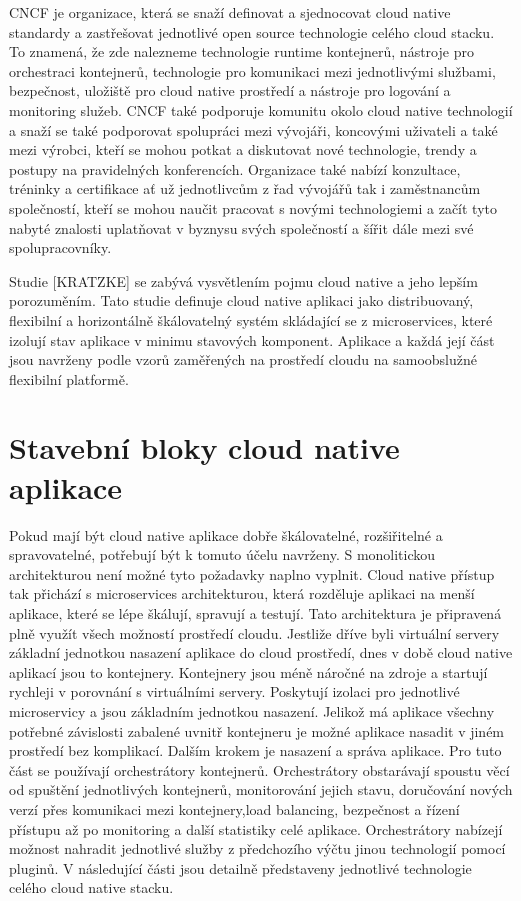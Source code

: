 	CNCF je organizace, která se snaží definovat a sjednocovat cloud native standardy a zastřešovat jednotlivé open source technologie celého cloud stacku. To znamená, že zde nalezneme technologie runtime kontejnerů, nástroje pro orchestraci kontejnerů, technologie pro komunikaci mezi jednotlivými službami, bezpečnost, uložiště pro cloud native prostředí a nástroje pro logování a monitoring služeb. CNCF také podporuje komunitu okolo cloud native technologií a snaží se také podporovat spolupráci mezi vývojáři, koncovými uživateli a také mezi výrobci, kteří se mohou potkat a diskutovat nové technologie, trendy a postupy na pravidelných konferencích. Organizace také nabízí konzultace, tréninky a certifikace ať už jednotlivcům z řad vývojářů tak i zaměstnancům společností, kteří se mohou naučit pracovat s novými technologiemi a začít tyto nabyté znalosti uplatňovat v byznysu svých společností a šířit dále mezi své spolupracovníky. \par
	    Studie [KRATZKE] se zabývá vysvětlením pojmu cloud native a jeho lepším porozuměním. Tato studie definuje cloud native aplikaci jako distribuovaný, flexibilní a horizontálně škálovatelný systém skládající se z microservices, které izolují stav aplikace v minimu stavových komponent. Aplikace a každá její část jsou navrženy podle vzorů zaměřených na prostředí cloudu na samoobslužné flexibilní platformě. \par
	        
\section{Stavební bloky cloud native aplikace}
		Pokud mají být cloud native aplikace dobře škálovatelné, rozšiřitelné a spravovatelné, potřebují být k tomuto účelu navrženy. S monolitickou architekturou není možné tyto požadavky naplno vyplnit. Cloud native přístup tak přichází s microservices architekturou, která rozděluje aplikaci na menší aplikace, které se lépe škálují, spravují a testují. Tato architektura je připravená plně využít všech možností prostředí cloudu. Jestliže dříve byli virtuální servery základní jednotkou nasazení aplikace do cloud prostředí, dnes v době cloud native aplikací jsou to kontejnery. Kontejnery jsou méně náročné na zdroje a startují rychleji v porovnání s virtuálními servery. Poskytují izolaci pro jednotlivé microservicy a jsou základním jednotkou nasazení. Jelikož má aplikace všechny potřebné závislosti zabalené uvnitř kontejneru je možné aplikace nasadit v jiném prostředí bez komplikací. Dalším krokem je nasazení a správa aplikace. Pro tuto část se používají orchestrátory kontejnerů. Orchestrátory obstarávají spoustu věcí od spuštění jednotlivých kontejnerů, monitorování jejich stavu, doručování nových verzí přes komunikaci mezi kontejnery,load balancing, bezpečnost a řízení přístupu až po monitoring a další statistiky celé aplikace. Orchestrátory nabízejí možnost nahradit jednotlivé služby z předchozího výčtu jinou technologií pomocí pluginů. V následující části jsou detailně představeny jednotlivé technologie celého cloud native stacku.

